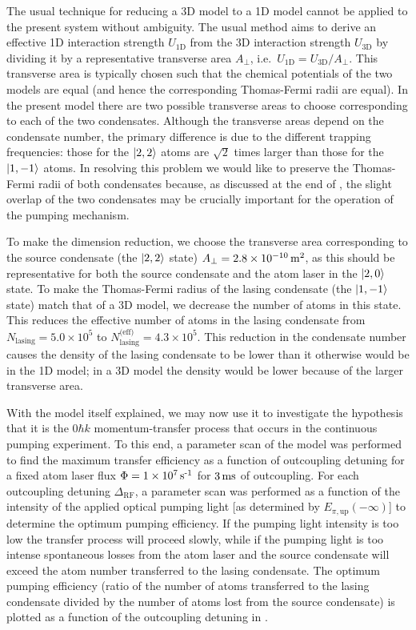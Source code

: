 The usual technique for reducing a 3D model to a 1D model cannot be applied to the present system without ambiguity.  The usual method aims to derive an effective 1D interaction strength $U_\text{1D}$ from the 3D interaction strength $U_\text{3D}$ by dividing it by a representative transverse area $A_\perp$, i.e.\ $U_\text{1D} = U_\text{3D}/A_\perp$.  This transverse area is typically chosen such that the chemical potentials of the two models are equal (and hence the corresponding Thomas-Fermi radii are equal).  In the present model there are two possible transverse areas to choose corresponding to each of the two condensates.  Although the transverse areas depend on the condensate number, the primary difference is due to the different trapping frequencies: those for the ${\left|2, 2\right>}$ atoms are $\sqrt{2}$ times larger than those for the ${\left|1, -1\right>}$ atoms.  In resolving this problem we would like to preserve the Thomas-Fermi radii of both condensates because, as discussed at the end of , the slight overlap of the two condensates may be crucially important for the operation of the pumping mechanism.

To make the dimension reduction, we choose the transverse area corresponding to the source condensate (the ${\left|2, 2\right>}$ state) $A_\perp = 2.8 \times\unit[10^{-10}]{m\textsuperscript{2}}$, as this should be representative for both the source condensate and the atom laser in the ${\left|2, 0\right>}$ state.  To make the Thomas-Fermi radius of the lasing condensate (the ${\left|1, -1\right>}$ state) match that of a 3D model, we decrease the number of atoms in this state.  This reduces the effective number of atoms in the lasing condensate from $N_\text{lasing} = 5.0\times 10^5$ to $N_\text{lasing}^\text{(eff)} = 4.3\times 10^5$.  This reduction in the condensate number causes the density of the lasing condensate to be lower than it otherwise would be in the 1D model; in a 3D model the density would be lower because of the larger transverse area.

\parasep

With the model itself explained, we may now use it to investigate the hypothesis that it is the $0 \hbar k$ momentum-transfer process that occurs in the continuous pumping experiment.  To this end, a parameter scan of the model was performed to find the maximum transfer efficiency as a function of outcoupling detuning for a fixed atom laser flux $\Phi = \unit[1\times 10^7]{s\textsuperscript{-1}}$ for $\unit[3]{ms}$ of outcoupling.  For each outcoupling detuning $\Delta_\text{RF}$, a parameter scan was performed as a function of the intensity of the applied optical pumping light [as determined by $E_{\pi, \text{up}}(-\infty)$] to determine the optimum pumping efficiency.  If the pumping light intensity is too low the transfer process will proceed slowly, while if the pumping light is too intense spontaneous losses from the atom laser and the source condensate will exceed the atom number transferred to the lasing condensate.  The optimum pumping efficiency (ratio of the number of atoms transferred to the lasing condensate divided by the number of atoms lost from the source condensate) is plotted as a function of the outcoupling detuning in .

